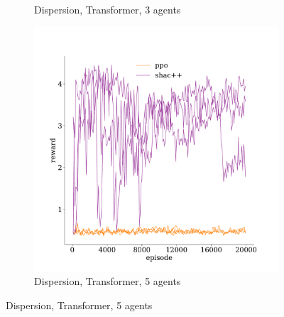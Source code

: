 \begin{figure}[t]
\begin{subfigure}[b]{0.32\textwidth}
        \caption{Dispersion, Transformer, 3 agents}
        \label{fig:dispersion-transformer-3}
    \end{subfigure}
    \begin{subfigure}[b]{0.32\textwidth}
        \includegraphics[width=\textwidth]{figs/dispersion-5-transformer.pdf}
        \caption{Dispersion, Transformer, 5 agents}
        \label{fig:dispersion-transformer-5}
    \end{subfigure}


\end{figure}
